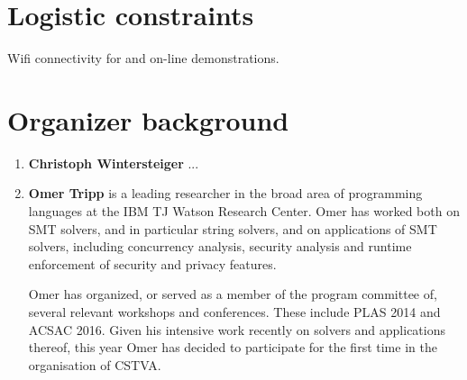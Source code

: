 \documentclass{sig-alternate}
\begin{document}

\section{Logistic constraints}
\vspace{0.2cm} Wifi connectivity for and on-line demonstrations.

\section{Organizer background}
\vspace{0.2cm}
\begin{enumerate}
\item {\bf Christoph Wintersteiger} ...

\item {\bf Omer Tripp} is a leading researcher in the broad area of programming languages at the IBM TJ Watson Research Center. Omer has worked both on SMT solvers, and in particular string solvers, and on applications of SMT solvers, including concurrency analysis, security analysis and runtime enforcement of security and privacy features.

Omer has organized, or served as a member of the program committee of, several relevant workshops and conferences. These include PLAS 2014 and ACSAC 2016. Given his intensive work recently on solvers and applications thereof, this year Omer has
  decided to participate for the first time in the organisation of
  CSTVA.
\end{enumerate}
\end{document}
